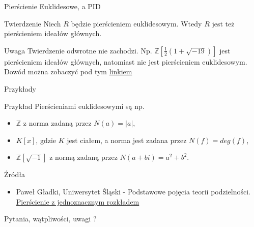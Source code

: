 \documentclass{beamer}
\begin{document}
\begin{frame}{Pierścienie Euklidesowe, a PID}
    \begin{block}{Twierdzenie}
        Niech $R$ będzie pierścieniem euklidesowym. Wtedy $R$ jest też pierścieniem ideałów głównych. 
    \end{block}
    \begin{alertblock}{Uwaga}
        Twierdzenie odwrotne nie zachodzi. Np. $\mathbb{Z}[\frac{1}{2}(1 + \sqrt{-19})]$ jest pierścieniem ideałów głównych, natomiast nie jest pierścieniem euklidesowym. 
        Dowód można zobaczyć pod tym \href{https://webspace.maths.qmul.ac.uk/r.a.wilson/MTH5100/PIDnotED.pdf}{\alert{linkiem}}
    \end{alertblock}
\end{frame}

\begin{frame}{Przykłady}
    \begin{exampleblock}{Przykład}
        Pierścieniami euklidesowymi są np. 
        \begin{itemize}
            \item $\mathbb{Z}$ z norma zadaną przez $N(a) = |a|$,
            \item $K[x]$, gdzie $K$ jest ciałem, a norma jest  zadana przez $N(f) = deg(f)$,
            \item $\mathbb{Z}[\sqrt{-1}]$ z normą zadaną przez $N(a + bi) = a^2 + b^2$.
        \end{itemize}
    \end{exampleblock}
\end{frame}

\begin{frame}{Źródła}
    \begin{itemize}
        \item[] \alert{Paweł Gładki}, Uniwersytet Śląski - Podstawowe pojęcia teorii podzielności. \href{https://www.math.us.edu.pl/~pgladki/teaching/2011-2012/a3z_w07.pdf}{Pierścienie z jednoznacznym rozkładem}
    \end{itemize}
    \printbibliography
\end{frame}

\begin{frame}
    \centering 
    \LARGE Pytania, wątpliwości, uwagi ? 
\end{frame}
\end{document}
